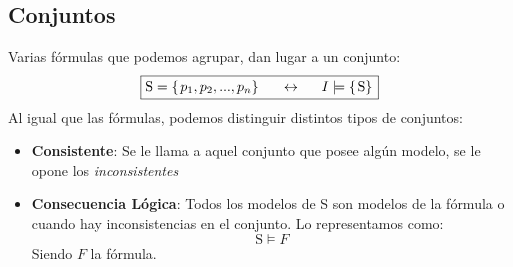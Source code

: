 \subsection{Conjuntos}
\noindent Varias fórmulas que podemos agrupar, dan lugar a un conjunto:
\[
        \boxed{\mathrm{S} = \left \{ \left. p_1, p_2, ..., p_n \right \} \right. \hspace{.5cm} \leftrightarrow \hspace{.5cm} I \models \left \{ \left. \mathrm{S} \right \} \right.}
\]
\noindent Al igual que las fórmulas, podemos distinguir distintos tipos de conjuntos:
\begin{itemize}
        \item \textbf{Consistente}: Se le llama a aquel conjunto que posee algún modelo, se le opone los \textit{inconsistentes}
        \item \textbf{Consecuencia Lógica}: Todos los modelos de S son modelos de la fórmula o cuando hay inconsistencias en el conjunto. Lo representamos como:
              \[
                      \boxed{\mathrm{S} \models F}
              \]
              \noindent Siendo \(F\) la fórmula.
\end{itemize}